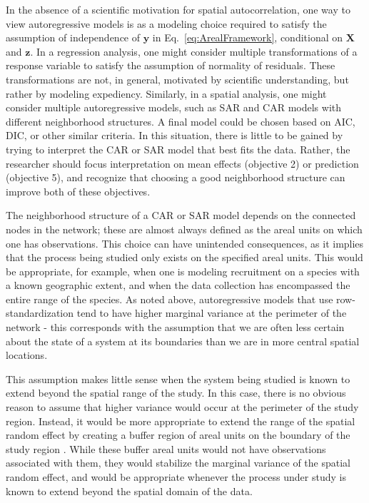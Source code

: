 \documentclass[11pt, titlepage]{article}\usepackage[]{graphicx}\usepackage[]{color}
\begin{document}
\begin{spacing}{1.9}
\begin{flushleft}
In the absence of a scientific motivation for spatial autocorrelation, one way to view autoregressive models is as a modeling choice required to satisfy the assumption of independence of $\mathbf{y}$ in  Eq.~\ref{eq:ArealFramework}, conditional on $\mathbf{X}$ and $\mathbf{z}$.  In a regression analysis, one might consider multiple transformations of a response variable to satisfy the assumption of normality of residuals.  These transformations are not, in general, motivated by scientific understanding, but rather by modeling expediency.  Similarly, in a spatial analysis, one might consider multiple autoregressive models, such as SAR and CAR models with different neighborhood structures.  A final model could be chosen based on AIC, DIC, or other similar criteria.  In this situation, there is little to be gained by trying to interpret the CAR or SAR model that best fits the data.  Rather, the researcher should focus interpretation on mean effects (objective 2) or prediction (objective 5), and recognize that choosing a good neighborhood structure can improve both of these objectives.

The neighborhood structure of a CAR or SAR model depends on the connected nodes in the network; these are almost always defined as the areal units on which one has observations.  This choice can have unintended consequences, as it implies that the process being studied only exists on the specified areal units.  This would be appropriate, for example, when one is modeling recruitment on a species with a known geographic extent, and when the data collection has encompassed the entire range of the species.  As noted above, autoregressive models that use row-standardization tend to have higher marginal variance at the perimeter of the network - this corresponds with the assumption that we are often less certain about the state of a system at its boundaries than we are in more central spatial locations.

This assumption makes little sense when the system being studied is known to extend beyond the spatial range of the study.  In this case, there is no obvious reason to assume that higher variance would occur at the perimeter of the study region.  Instead, it would be more appropriate to extend the range of the spatial random effect by creating a buffer region of areal units on the boundary of the study region  \citep[e.g.,][]{Lind:Rue:Lind:expl:2011}.  While these buffer areal units would not have observations associated with them, they would stabilize the marginal variance of the spatial random effect, and would be appropriate whenever the process under study is known to extend beyond the spatial domain of the data.    


\end{flushleft}
\end{spacing}
\end{document}
